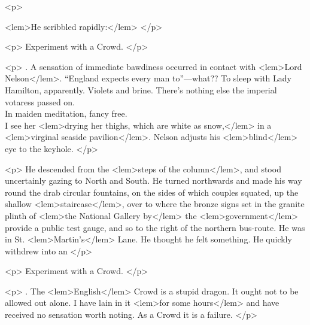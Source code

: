 {{				<p>
				 
<lem>He scribbled rapidly:</lem>{}
				</p>

				<p> 
				\vspace{10pt}
				\noindent\large{Experiment with a Crowd.}
				</p>

				<p> 
				.\hspace{5pt} A sensation of immediate bawdiness occurred in contact with 
<lem>Lord Nelson</lem>{}. 
				“England 
				expects every man to”---what?? To sleep with Lady Hamilton, apparently. Violets and 
				brine. There's nothing else  
					{} 
				the imperial votaress passed on.\\ 
				In maiden meditation, fancy free.\\
				I see her 
<lem>drying her thighs, which are white as snow,</lem>
					{} 
				in a 
<lem>virginal seaside pavilion</lem>{}. Nelson adjusts his 
<lem>blind</lem>
					{} 
				eye to the 
				keyhole. 
				</p> 

				<p>
				\vspace{10pt}
He descended from the 
<lem>steps of the column</lem>{}, 
				and stood uncertainly gazing to North and South. He 
				turned northwards and made his way round the drab circular fountains, on the sides 
				of which couples squated, up the shallow 
<lem>staircase</lem>{}, 
				over to where the bronze signs set 
				in the granite plinth of  
<lem>the National Gallery by</lem>
					{}
				the 
<lem>government</lem>
					{} 
				provide a public test 
				gauge, and so to the right of the northern bus-route. He was in St. 
<lem>Martin's</lem>
					{} 
				Lane. 
				He thought he felt something. He quickly withdrew into an 
					{} 
 				</p> 

				<p>
				\vspace{10pt}
				\noindent\large{Experiment with a Crowd.}
 				</p> 

				<p>
				.\hspace{5pt} The 
<lem>English</lem>{} Crowd is a stupid dragon. 
				It ought not to be allowed out alone. I 
				have lain in it 
<lem>for some hours</lem>
					{} 
				and have received no sensation worth noting. As a Crowd it 
				is a failure.
 				</p> 

}}
